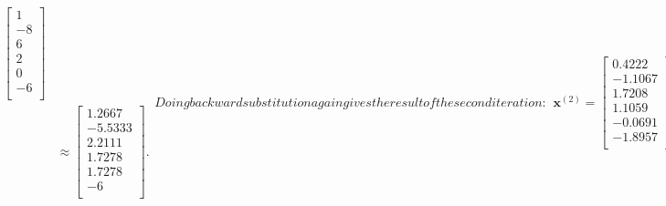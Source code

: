 \begin{subequations}
\begin{align}
  \left[ \begin{array}{c}  1 \\ -8 \\  6 \\  2 \\  0 \\ -6 \\ \end{array} \right] \nonumber \\
  &\approx \left[ \begin{array}{c}  1.2667 \\ -5.5333 \\  2.2111 \\  1.7278 \\  1.7278 \\ -6 \\ \end{array} \right] .
\end{align}
Doing backward substitution again gives the result of the second iteration:
\begin{align}
\mathbf{x}^{(2)} =
  \left[ \begin{array}{r} 0.4222 \\ -1.1067 \\ 1.7208 \\ 1.1059 \\ -0.0691 \\ -1.8957 \\ \end{array} \right].
\end{align}
Repeating this for the third iteration:
\begin{align}
\mathbf{x}^{(3)} =
  \left[ \begin{array}{r} 0.1286  \\ -1.0491 \\ 1.9096 \\ 1.0394  \\ -0.0221 \\ -1.9663 \\ \end{array} \right].
\end{align}  
And again for the fourth iteration:
\begin{align}
\mathbf{x}^{(4)} =
  \left[ \begin{array}{r} 0.0465  \\ -1.0169 \\ 1.9683 \\ 1.0130  \\ -0.0074 \\ -1.9884 \\ \end{array} \right].

\end{align}
\end{subequations}
